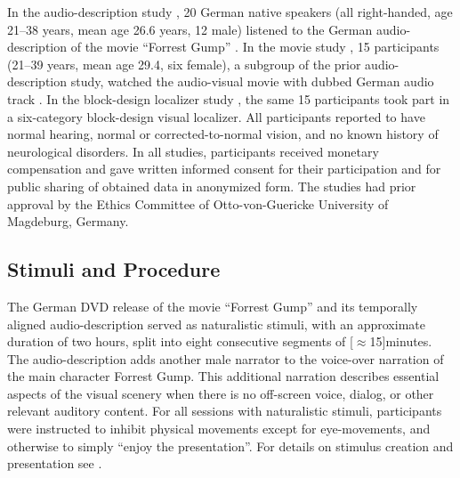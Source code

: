 {



In the audio-description study \citep{hanke2014audiomovie}, 20 German native
speakers (all right-handed, age 21–38 years, mean age 26.6 years, 12 male)
listened to the German audio-description \citep{ForrestGumpGermanAD} of the
movie ``Forrest Gump'' \citep{ForrestGumpMovie}.
In the movie study \citep{hanke2016simultaneous}, 15 participants (21–39 years,
mean age 29.4, six female), a subgroup of the prior audio-description study,
watched the audio-visual movie with dubbed German audio track
\citep{ForrestGumpDVD}.
In the block-design localizer study \citep{sengupta2016extension}, the same 15
participants took part in a six-category block-design visual localizer.
All participants reported to have normal hearing, normal or corrected-to-normal
vision, and no known history of neurological disorders.
In all studies, participants received monetary compensation and gave written
informed consent for their participation and for public sharing of obtained data
in anonymized form. The studies had prior approval by the Ethics Committee of
Otto-von-Guericke University of Magdeburg, Germany.


\subsection{Stimuli and Procedure}


The German DVD release \citep{ForrestGumpDVD} of the movie ``Forrest Gump''
\citep{ForrestGumpMovie} and its temporally aligned audio-description
\citep{ForrestGumpGermanAD} served as naturalistic stimuli, with an approximate
duration of two hours, split into eight consecutive segments of
\unit[$\approx$15]{minutes}.
The audio-description adds another male narrator to the voice-over narration of
the main character Forrest Gump. This additional narration describes essential
aspects of the visual scenery when there is no off-screen voice, dialog, or
other relevant auditory content.
For all sessions with naturalistic stimuli, participants were instructed to
inhibit physical movements except for eye-movements, and otherwise to simply
``enjoy the presentation''.
%
For details on stimulus creation and presentation see
\citet{hanke2014audiomovie, hanke2016simultaneous}.

}

